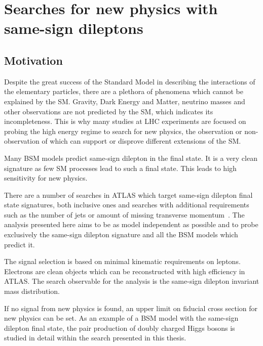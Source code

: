 \chapter{Searches for new physics with same-sign dileptons}
\label{chap:SS}
\section{Motivation}

Despite the great success of the Standard Model in describing the interactions of the elementary particles, there are a plethora of phenomena
which cannot be explained by the SM. Gravity, Dark Energy and Matter, neutrino masses and other observations are not predicted by the
SM, which indicates its incompleteness.
This is why many studies at LHC experiments are focused on probing the high energy regime to search for new physics, 
the observation or non-observation of which can support or disprove different extensions of the SM.

Many BSM models predict same-sign dilepton in the final state.
It is a very clean signature as few SM processes lead to such a final state.
This leads to high sensitivity for new physics.

There are a number of searches in ATLAS which target same-sign dilepton final state signatures, both inclusive ones and searches with additional requirements such as the number of jets or amount of missing transverse momentum~\cite{heavy_majorana_neutrino_paper,floderus_paper,Aad:2014pda}.
The analysis presented here aims to be as model independent as possible and to probe exclusively the same-sign dilepton signature and all the BSM models which predict it.

The signal selection is based on minimal kinematic requirements on leptons.
Electrons are clean objects which can be reconstructed with high efficiency in ATLAS.
The search observable for the analysis is the same-sign dilepton invariant mass distribution.

If no signal from new physics is found, an upper limit on fiducial cross section for new physics can be set.
As an example of a BSM model with the same-sign dilepton final state, the pair production of doubly charged Higgs bosons is studied in detail within the search presented in this thesis.

